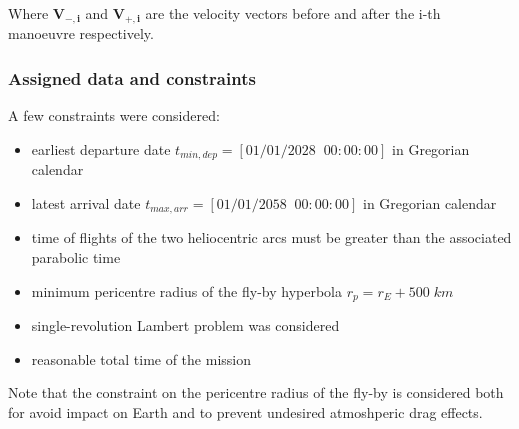 Where $\boldsymbol{V_{-,i}}$ and $\boldsymbol{V_{+,i}}$ are the velocity vectors before and after the i-th manoeuvre respectively.

\subsubsection{Assigned data and constraints}
\label{subsubsec:data_constraints}
A few constraints were considered:
\begin{itemize}
    [wide,itemsep=3pt,topsep=3pt]
    \item earliest departure date $t_{min,dep} = \left[01/01/2028 \;\; 00:00:00\right]$ in Gregorian calendar
    \item latest arrival date $t_{max,arr} = \left[01/01/2058 \;\; 00:00:00\right]$ in Gregorian calendar
    \item time of flights of the two heliocentric arcs must be greater than the associated parabolic time
    \item minimum pericentre radius of the fly-by hyperbola $r_p = r_E + 500 \; km$
    \item single-revolution Lambert problem was considered
    \item reasonable total time of the mission
\end{itemize}

Note that the constraint on the pericentre radius of the fly-by is considered both for avoid impact on Earth and to prevent undesired atmoshperic drag effects. 



